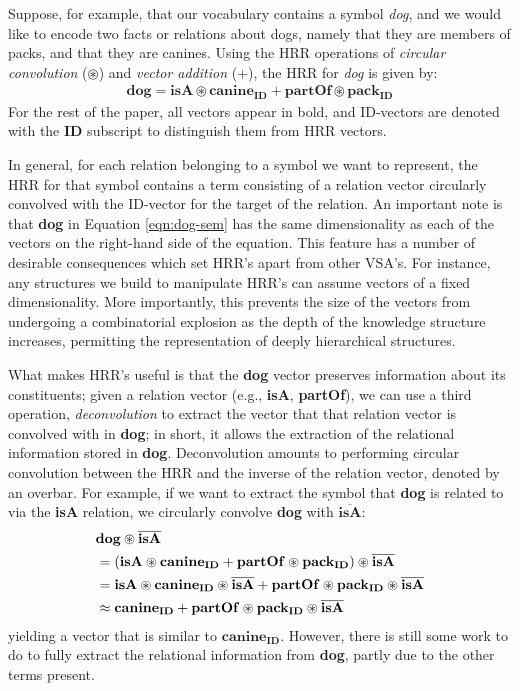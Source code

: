 \documentclass[10pt,letterpaper]{article}
\begin{document}
Suppose, for example, that our vocabulary contains a symbol \textit{dog}, and we would like to encode two facts or relations about dogs, namely that they are members of packs, and that they are canines. Using the HRR operations of \textit{circular convolution} ($\circledast$) and \textit{vector addition} ($+$), the HRR for \textit{dog} is given by:
\begin{align}
  \mathbf{dog} = \mathbf{isA} \circledast \mathbf{canine_{ID}} + \mathbf{partOf} \circledast \mathbf{pack_{ID}}\label{eqn:dog-sem}
\end{align}
For the rest of the paper, all vectors appear in bold, and ID-vectors are denoted with the \textbf{ID} subscript to distinguish them from HRR vectors. 

In general, for each relation belonging to a symbol we want to represent, the HRR for that symbol contains a term consisting of a relation vector circularly convolved with the ID-vector for the target of the relation. An important note is that \textbf{dog} in Equation \eqref{eqn:dog-sem} has the same dimensionality as each of the vectors on the right-hand side of the equation. This feature has a number of desirable consequences which set HRR's apart from other VSA's. For instance, any structures we build to manipulate HRR's can assume vectors of a fixed dimensionality. More importantly, this prevents the size of the vectors from undergoing a combinatorial explosion as the depth of the knowledge structure increases, permitting the representation of deeply hierarchical structures.

What makes HRR's useful is that the \textbf{dog} vector preserves information about its constituents; given a relation vector (e.g., \textbf{isA}, \textbf{partOf}), we can use a third operation, \textit{deconvolution} to extract the vector that that relation vector is convolved with in \textbf{dog}; in short, it allows the extraction of the relational information stored in \textbf{dog}. Deconvolution amounts to performing circular convolution between the HRR and the inverse of the relation vector, denoted by an overbar. For example, if we want to extract the symbol that \textbf{dog} is related to via the \textbf{isA} relation, we circularly convolve \textbf{dog} with $\overline{\mathbf{isA}}$:
\begin{align}
&\mathbf{dog} \circledast \overline{\mathbf{isA} }\notag\\
&=(\mathbf{isA} \circledast \mathbf{canine_{ID}} + \mathbf{partOf} \circledast \mathbf{pack_{ID}}) \circledast \overline{\mathbf{isA} }\notag\\
&=\mathbf{isA} \circledast \mathbf{canine_{ID}} \circledast \overline{\mathbf{isA} } + \mathbf{partOf} \circledast \mathbf{pack_{ID}} \circledast \overline{\mathbf{isA} }\notag\\
&\approx \mathbf{canine_{ID}} + \mathbf{partOf} \circledast \mathbf{pack_{ID}} \circledast \overline{\mathbf{isA} }\label{eqn:unbind}
\end{align}
yielding a vector that is similar to $\mathbf{canine_{ID}}$. However, there is still some work to do to fully extract the relational information from \textbf{dog}, partly due to the other terms present.
\end{document}
